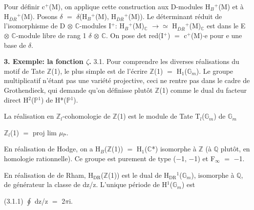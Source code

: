 \documentclass[10pt,twoside]{article}
\newcommand{\SectionLead}[1]{\textbf{\color{D030Accent}#1}}
\begin{document}
Pour définir c\ensuremath{^{+}}(M), on applique cette construction aux D-modules H\ensuremath{_{B}}\ensuremath{^{+}}(M) et à H\ensuremath{_{\overline{D}\overline{R}}}\ensuremath{^{+}}(M). Posons \ensuremath{δ} \ensuremath{=} \ensuremath{δ}(H\ensuremath{_{B}}\ensuremath{^{+}}(M), H\ensuremath{_{\overline{D}\overline{R}}}\ensuremath{^{+}}(M)). Le déterminant réduit de l’isomorphisme de D \ensuremath{⊗} \ensuremath{ℂ}-modules I\ensuremath{^{+}}: H\ensuremath{_{B}}\ensuremath{^{+}}(M)\ensuremath{_{ℂ}} \ensuremath{→}\ensuremath{≃} H\ensuremath{_{\overline{D}\overline{R}}}\ensuremath{^{+}}(M)\ensuremath{_{ℂ}} est dans le E \ensuremath{⊗} \ensuremath{ℂ}-module libre de rang 1 \ensuremath{δ} \ensuremath{⊗} \ensuremath{ℂ}. On pose det red(I\ensuremath{^{+}}) \ensuremath{=} c\ensuremath{^{+}}(M)\ensuremath{·}e pour e une base de \ensuremath{δ}.\par
\SectionLead{3. Exemple: la fonction \ensuremath{ζ}.} 3.1. Pour comprendre les diverses réalisations du motif de Tate \ensuremath{ℤ}(1), le plus simple est de l’écrire \ensuremath{ℤ}(1) \ensuremath{=} H\ensuremath{_{1}}(\ensuremath{𝔾}\ensuremath{_{m}}). Le groupe multiplicatif n’étant pas une variété projective, ceci ne rentre pas dans le cadre de Grothendieck, qui demande qu’on définisse plutôt \ensuremath{ℤ}(1) comme le dual du facteur direct H\ensuremath{^{2}}(\ensuremath{ℙ}\ensuremath{^{1}}) de H*(\ensuremath{ℙ}\ensuremath{^{1}}).\par
La réalisation en \ensuremath{ℤ}\ensuremath{_{l}}-cohomologie de \ensuremath{ℤ}(1) est le module de Tate T\ensuremath{_{l}}(\ensuremath{𝔾}\ensuremath{_{m}}) de \ensuremath{𝔾}\ensuremath{_{m}}\par
\ensuremath{ℤ}\ensuremath{_{l}}(1) \ensuremath{=} proj lim \ensuremath{μ}\ensuremath{_{lⁿ}}.\par
En réalisation de Hodge, on a H\ensuremath{_{B}}(\ensuremath{ℤ}(1)) \ensuremath{=} H\ensuremath{_{1}}(\ensuremath{ℂ}*) isomorphe à \ensuremath{ℤ} (à \ensuremath{ℚ} plutôt, en homologie rationnelle). Ce groupe est purement de type (\ensuremath{−}1, \ensuremath{−}1) et F\ensuremath{_{∞}} \ensuremath{=} \ensuremath{−}1.\par
En réalisation de de Rham, H\ensuremath{_{\mathrm{DR}}}(\ensuremath{ℤ}(1)) est le dual de H\ensuremath{_{\mathrm{DR}}}\ensuremath{^{1}}(\ensuremath{𝔾}\ensuremath{_{m}}), isomorphe à \ensuremath{ℚ}, de générateur la classe de dz/z. L’unique période de H\ensuremath{^{1}}(\ensuremath{𝔾}\ensuremath{_{m}}) est\par
(3.1.1)    \ensuremath{∮} dz/z \ensuremath{=} 2\ensuremath{π}i.\par
\end{document}
